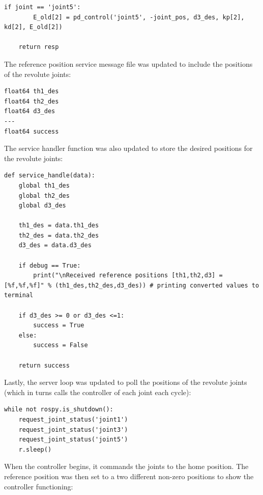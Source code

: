 \documentclass[10pt]{article}
\begin{document}
\begin{enumerate}
\begin{lstlisting}[style=Matlab-editor,basicstyle=\mlttfamily,escapechar=`]
	if joint == 'joint5':
		E_old[2] = pd_control('joint5', -joint_pos, d3_des, kp[2], kd[2], E_old[2])
	
	return resp
\end{lstlisting} 

	The reference position service message file was updated to include the positions of the revolute joints:
	
\begin{lstlisting}[style=Matlab-editor,basicstyle=\mlttfamily,escapechar=`]
float64 th1_des
float64 th2_des
float64 d3_des
---
float64 success
\end{lstlisting}

	The service handler function was also updated to store the desired positions for the revolute joints:
	
\begin{lstlisting}[style=Matlab-editor,basicstyle=\mlttfamily,escapechar=`]
def service_handle(data):
	global th1_des
	global th2_des
	global d3_des
	
	th1_des = data.th1_des
	th2_des = data.th2_des
	d3_des = data.d3_des
	
	if debug == True:
		print("\nReceived reference positions [th1,th2,d3] = [%f,%f,%f]" % (th1_des,th2_des,d3_des)) # printing converted values to terminal
	
	if d3_des >= 0 or d3_des <=1:
		success = True
	else:
		success = False
	
	return success
\end{lstlisting}	

	Lastly, the server loop was updated to poll the positions of the revolute joints (which in turns calls the controller of each joint each cycle):
	
\begin{lstlisting}[style=Matlab-editor,basicstyle=\mlttfamily,escapechar=`]
while not rospy.is_shutdown():
	request_joint_status('joint1')
	request_joint_status('joint3')
	request_joint_status('joint5')
	r.sleep()
\end{lstlisting}	


	When the controller begins, it commands the joints to the home position. The reference position was then set to a two different non-zero positions to show the controller functioning:
	

\end{enumerate}
\end{document}
